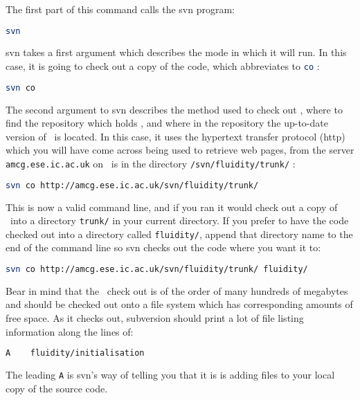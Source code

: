 The first part of this command calls the svn program:

\begin{lstlisting}[language=Bash]
svn
\end{lstlisting}

svn takes a first argument which describes the mode in which it will run. In
this case, it is going to check out a copy of the code, which abbreviates to
\lstinline[language=Bash]+co+ :

\begin{lstlisting}[language=Bash]
svn co
\end{lstlisting}

The second argument to svn describes the method used to check out \fluidity,
where to find the repository which holds \fluidity, and where in the repository
the up-to-date version of \fluidity\ is located. In this case, it uses the
hypertext transfer protocol (http) which you will have come across being used
to retrieve web pages, from the server 
\lstinline[language=Bash]+amcg.ese.ic.ac.uk+ on \fluidity\ is in the directory
\lstinline[language=Bash]+/svn/fluidity/trunk/+ :

\begin{lstlisting}[language=Bash]
svn co http://amcg.ese.ic.ac.uk/svn/fluidity/trunk/
\end{lstlisting}

This is now a valid command line, and if you ran it would check out a copy of
\fluidity\ into a directory \lstinline[language=Bash]+trunk/+ in your current
directory. If you prefer to have the code checked out into a directory called
\lstinline[language=Bash]+fluidity/+, append that directory name to the end of
the command line so svn checks out the code where you want it to:

\begin{lstlisting}[language=Bash]
svn co http://amcg.ese.ic.ac.uk/svn/fluidity/trunk/ fluidity/
\end{lstlisting}

Bear in mind that the \fluidity\ check out is of the order of many hundreds of
megabytes and should be checked out onto a file system which has corresponding
amounts of free space. As it checks out, subversion should print a lot of file
listing information along the lines of:

\begin{lstlisting}[language=Bash]
A    fluidity/initialisation
\end{lstlisting}

The leading \lstinline[language=Bash]+A+ is svn's way of telling you that it is
is adding files to your local copy of the source code.


